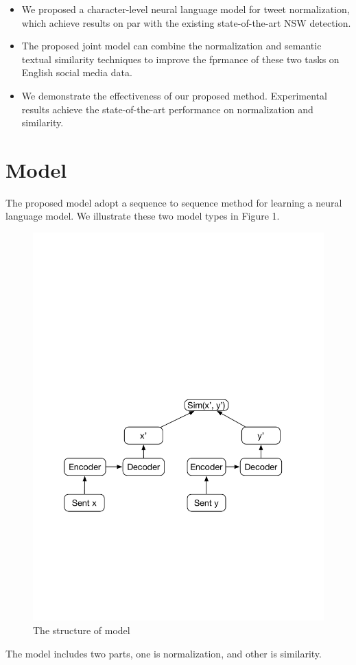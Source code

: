 \documentclass[letterpaper]{article}
\begin{document}
\begin{itemize}
	\item We proposed a character-level neural language model for tweet normalization, which achieve results on par with the existing state-of-the-art NSW detection.
	\item The proposed joint model can combine the normalization and semantic textual similarity techniques to improve the fprmance of these two tasks on English social media data.
	\item We demonstrate the effectiveness of our proposed method. Experimental results achieve the state-of-the-art performance on normalization and similarity.
\end{itemize}

\section{Model}
The proposed model adopt a sequence to sequence method for learning a neural language model. We illustrate these two model types in Figure 1.
\begin{figure}
\centering
\includegraphics[width=0.7\linewidth]{model}
\caption{The structure of model}
\label{fig:model}
\end{figure}


The model includes two parts, one is normalization, and other is similarity.
\end{document}

